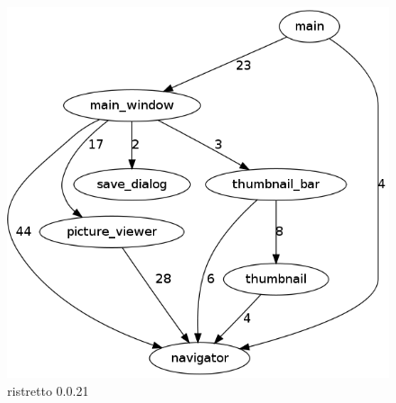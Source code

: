 \begin{figure}[h]
\center
\includegraphics[scale=0.4]{imagens/ristretto-0_0_21-doxyparse-2}
\caption{ristretto 0.0.21}
\label{fig:ristretto-0.0.21-doxyparse-2-anexo}
\end{figure}
